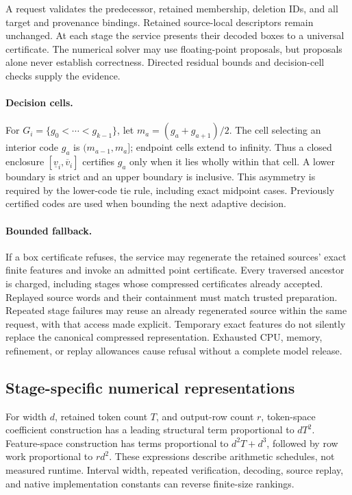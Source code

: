 \documentclass[10pt,twocolumn,letterpaper]{article}
\begin{document}
A request validates the predecessor, retained membership, deletion IDs, and all
target and provenance bindings. Retained source-local descriptors remain
unchanged. At each stage the service presents their decoded boxes to a universal
certificate. The numerical solver may use floating-point proposals, but proposals
alone never establish correctness. Directed residual bounds and decision-cell
checks supply the evidence.

\paragraph{Decision cells.}
For $G_i=\{g_0<\cdots<g_{k-1}\}$, let
$m_a=(g_a+g_{a+1})/2$. The cell selecting an interior code $g_a$ is
$(m_{a-1},m_a]$; endpoint cells extend to infinity. Thus a closed enclosure
$[\underline v_i,\overline v_i]$ certifies $g_a$ only when it lies wholly within
that cell. A lower boundary is strict and an upper boundary is inclusive. This
asymmetry is required by the lower-code tie rule, including exact midpoint cases.
Previously certified codes are used when bounding the next adaptive decision.

\paragraph{Bounded fallback.}
If a box certificate refuses, the service may regenerate the retained sources'
exact finite features and invoke an admitted point certificate. Every traversed
ancestor is charged, including stages whose compressed certificates already
accepted. Replayed source words and their containment must match trusted
preparation. Repeated stage failures may reuse an already regenerated source
within the same request, with that access made explicit. Temporary exact features
do not silently replace the canonical compressed representation. Exhausted CPU,
memory, refinement, or replay allowances cause refusal without a complete model
release.

\subsection{Stage-specific numerical representations}
For width $d$, retained token count $T$, and output-row count $r$, token-space
coefficient construction has a leading structural term proportional to $dT^2$.
Feature-space construction has terms proportional to $d^2T+d^3$, followed by
row work proportional to $rd^2$. These expressions describe arithmetic schedules,
not measured runtime. Interval width, repeated verification, decoding, source
replay, and native implementation constants can reverse finite-size rankings.
\end{document}
